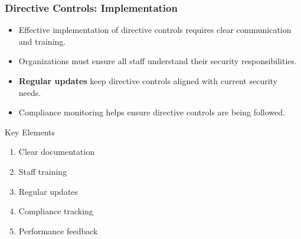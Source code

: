 \documentclass{beamer}
\begin{document}
\begin{frame}
    \frametitle{Directive Controls: Implementation}
    
    \begin{itemize}
        \item Effective implementation of directive controls requires clear communication and training.
        
        \item Organizations must ensure all staff understand their security responsibilities.
        
        \item \textbf{Regular updates} keep directive controls aligned with current security needs.
        
        \item Compliance monitoring helps ensure directive controls are being followed.
    \end{itemize}
    
    \begin{block}{Key Elements}
        \begin{enumerate}
            \item Clear documentation
            \item Staff training
            \item Regular updates
            \item Compliance tracking
            \item Performance feedback
        \end{enumerate}
    \end{block}
\end{frame}
\end{document}
